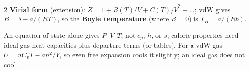 \begin{multicols}{2}
\textbf{Virial form} (extension): $Z=1+B(T)/\bar V+C(T)/\bar V^2+\dots$; vdW gives $B=b-a/(RT)$, so the \textbf{Boyle temperature} (where $B=0$) is $T_B=a/(Rb)$. \EXT

\begin{trapbox}An equation of state alone gives $P$--$\bar V$--$T$, not $c_p$, $h$, or $s$; caloric properties need ideal-gas heat capacities plus departure terms (or tables). For a vdW gas $U=nC_vT-an^2/V$, so even free expansion cools it slightly; an ideal gas does not cool.\end{trapbox}
\end{multicols}
